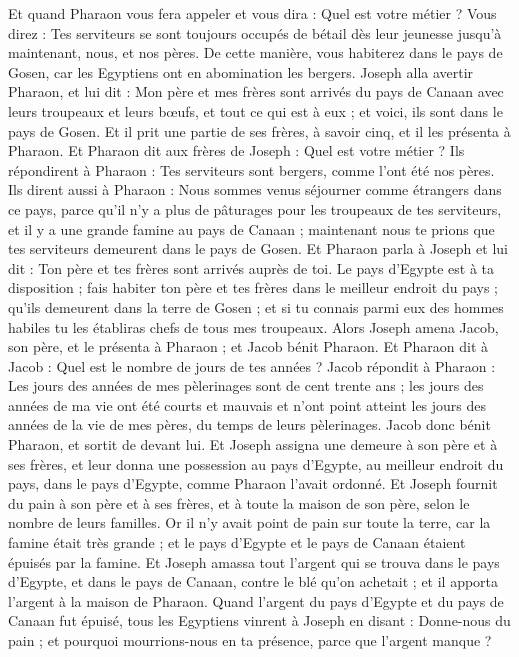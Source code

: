 \begin{multicols}{2}
Et quand Pharaon vous fera appeler et vous dira : Quel est votre métier ?
Vous direz : Tes serviteurs se sont toujours occupés de bétail dès leur jeunesse jusqu'à maintenant, nous, et nos pères. De cette manière, vous habiterez dans le pays de Gosen, car les Egyptiens ont en abomination les bergers.
\VerseOne{}Joseph alla avertir Pharaon, et lui dit : Mon père  et mes frères sont arrivés du pays de Canaan avec leurs troupeaux et leurs bœufs, et tout ce qui est à eux ; et voici, ils sont dans le pays de Gosen.
Et il prit une partie de ses frères, à savoir cinq, et il les présenta à Pharaon.
Et Pharaon dit aux frères de Joseph : Quel est votre métier ? Ils répondirent à Pharaon : Tes serviteurs sont bergers, comme l'ont été nos pères.
Ils dirent aussi à Pharaon : Nous sommes venus séjourner comme étrangers dans ce pays, parce qu'il n'y a plus de pâturages pour les troupeaux de tes serviteurs, et il y a une grande famine au pays de Canaan ; maintenant nous te prions que tes serviteurs demeurent dans le pays de Gosen.
Et Pharaon parla à Joseph et lui dit : Ton père et tes frères sont arrivés auprès de toi.
Le pays d'Egypte est à ta disposition ; fais habiter ton père et tes frères dans le meilleur endroit du pays ; qu'ils demeurent dans la terre de Gosen ; et si tu connais parmi eux des hommes habiles tu les établiras chefs de tous mes troupeaux.
Alors Joseph amena Jacob, son père, et le présenta à Pharaon ; et Jacob bénit Pharaon.
Et Pharaon dit à Jacob : Quel est le nombre de jours de tes années ?
Jacob répondit à Pharaon : Les jours des années de mes pèlerinages sont de cent trente ans ; les jours des années de ma vie ont été courts et mauvais et n'ont point atteint les jours des années de la vie de mes pères, du temps de leurs pèlerinages.
Jacob donc bénit Pharaon, et sortit de devant lui.
Et Joseph assigna une demeure à son père et à ses frères, et leur donna une possession au pays d'Egypte, au meilleur endroit du pays, dans le pays d'Egypte, comme Pharaon l'avait ordonné.
Et Joseph fournit du pain à son père et à ses frères, et à toute la maison de son père, selon le nombre de leurs familles.
Or il n'y avait point de pain sur toute la terre, car la famine était très grande ; et le pays d'Egypte et le pays de Canaan étaient épuisés par la famine.
Et Joseph amassa tout l'argent qui se trouva dans le pays d'Egypte, et dans le pays de Canaan, contre le blé qu'on achetait ; et il apporta l'argent à la maison de Pharaon.
Quand l'argent du pays d'Egypte et du pays de Canaan fut épuisé, tous les Egyptiens vinrent à Joseph en disant : Donne-nous du pain ; et pourquoi mourrions-nous en ta présence, parce que l'argent manque ?

\end{multicols}
